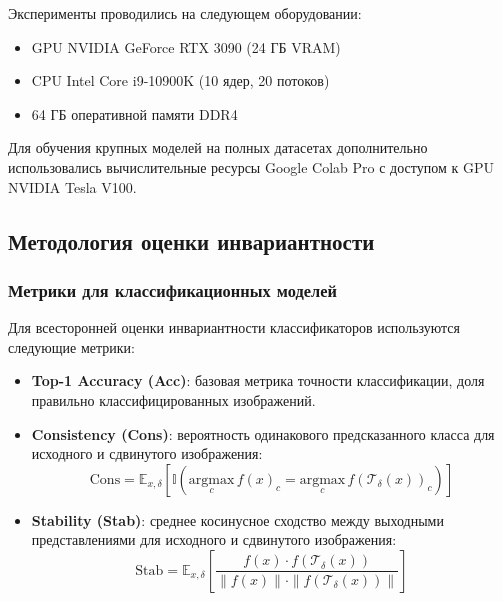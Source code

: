 Эксперименты проводились на следующем оборудовании:
\begin{itemize}
    \item GPU NVIDIA GeForce RTX 3090 (24 ГБ VRAM)
    \item CPU Intel Core i9-10900K (10 ядер, 20 потоков)
    \item 64 ГБ оперативной памяти DDR4
\end{itemize}

Для обучения крупных моделей на полных датасетах дополнительно использовались вычислительные ресурсы Google Colab Pro с доступом к GPU NVIDIA Tesla V100.

\subsection{Методология оценки инвариантности}
\label{sec:evaluation}

\subsubsection{Метрики для классификационных моделей}
\label{sec:evaluation:classification}

Для всесторонней оценки инвариантности классификаторов используются следующие метрики:

\begin{itemize}
    \item \textbf{Top-1 Accuracy (Acc)}: базовая метрика точности классификации, доля правильно классифицированных изображений.
    
    \item \textbf{Consistency (Cons)}: вероятность одинакового предсказанного класса для исходного и сдвинутого изображения:
    \begin{equation}
    \text{Cons} = \mathbb{E}_{x, \delta} \left[ \mathbb{I} \left( \underset{c}{\text{argmax}} \, f(x)_c = \underset{c}{\text{argmax}} \, f(\mathcal{T}_\delta(x))_c \right) \right]
    \end{equation}
    
    \item \textbf{Stability (Stab)}: среднее косинусное сходство между выходными представлениями для исходного и сдвинутого изображения:
    \begin{equation}
    \text{Stab} = \mathbb{E}_{x, \delta} \left[ \frac{f(x) \cdot f(\mathcal{T}_\delta(x))}{\|f(x)\| \cdot \|f(\mathcal{T}_\delta(x))\|} \right]
    \end{equation}
\end{itemize}

